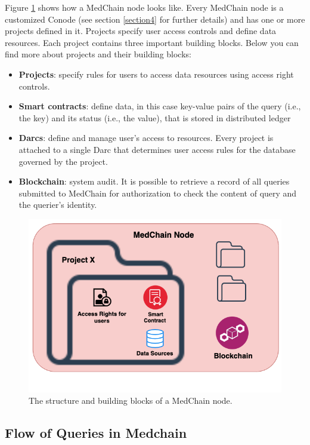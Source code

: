 Figure \ref{fig:medchain_node} shows how a MedChain node looks like. Every MedChain node is a customized Conode (see section \ref{section4} for further details) and has one or more projects defined in it. Projects specify user access controls and define data resources. Each project contains three important building blocks. Below you can find more about projects and their building blocks:
\begin{itemize}
    \item \textbf{Projects}: specify rules for users to access data resources using access right controls.
    \item \textbf{Smart contracts}: define data, in this case key-value pairs of the query (i.e., the key) and its status (i.e., the value), that is stored in distributed ledger
    \item \textbf{Darcs}: define and manage user's access to resources. Every project is attached to a single Darc that determines user access rules for the database governed by the project. 
    \item \textbf{Blockchain}: system audit. It is possible to retrieve a record of all queries submitted to MedChain for authorization to check the content of query and the querier's identity. 
\end{itemize}


\begin{figure}[ht] 
        \centering \includegraphics[width=0.7\columnwidth]{Images/medchain_node.png}
        \caption{\label{fig:medchain_node} 
         The structure and building blocks of a MedChain node.
        }
\end{figure}




\subsection{Flow of Queries in Medchain}\label{arch:flow}

